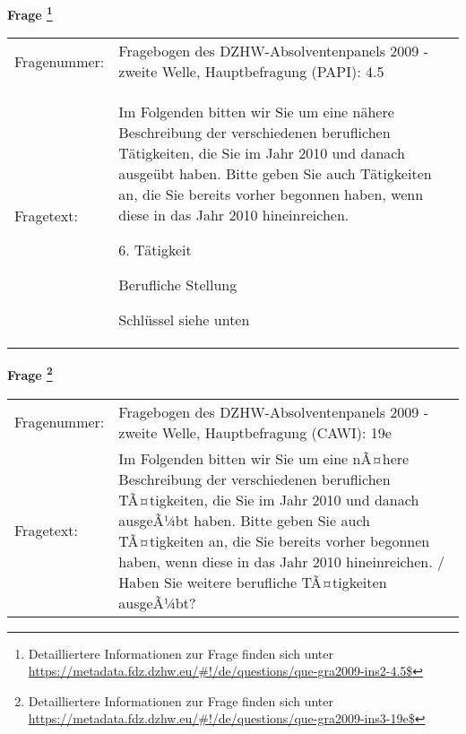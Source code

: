 				\vspace*{0.5cm}
                \noindent\textbf{Frage
	                \footnote{Detailliertere Informationen zur Frage finden sich unter
		              \url{https://metadata.fdz.dzhw.eu/\#!/de/questions/que-gra2009-ins2-4.5$}}}\\
				\begin{tabularx}{\hsize}{@{}lX}
					Fragenummer: &
					  Fragebogen des DZHW-Absolventenpanels 2009 - zweite Welle, Hauptbefragung (PAPI):
					  4.5
 \\
					Fragetext: & Im Folgenden bitten wir Sie um eine nähere Beschreibung der verschiedenen beruflichen Tätigkeiten, die Sie im Jahr 2010 und danach ausgeübt haben. Bitte geben Sie auch Tätigkeiten an, die Sie bereits vorher begonnen haben, wenn diese in das Jahr 2010 hineinreichen.\par  6. Tätigkeit\par  Berufliche Stellung\par  Schlüssel siehe unten \\
				\end{tabularx}
				\vspace*{0.5cm}
                \noindent\textbf{Frage
	                \footnote{Detailliertere Informationen zur Frage finden sich unter
		              \url{https://metadata.fdz.dzhw.eu/\#!/de/questions/que-gra2009-ins3-19e$}}}\\
				\begin{tabularx}{\hsize}{@{}lX}
					Fragenummer: &
					  Fragebogen des DZHW-Absolventenpanels 2009 - zweite Welle, Hauptbefragung (CAWI):
					  19e
 \\
					Fragetext: & Im Folgenden bitten wir Sie um eine nÃ¤here Beschreibung der verschiedenen beruflichen TÃ¤tigkeiten, die Sie im Jahr 2010 und danach ausgeÃ¼bt haben. Bitte geben Sie auch TÃ¤tigkeiten an, die Sie bereits vorher begonnen haben, wenn diese in das Jahr 2010 hineinreichen. / Haben Sie weitere berufliche TÃ¤tigkeiten ausgeÃ¼bt? \\
				\end{tabularx}





